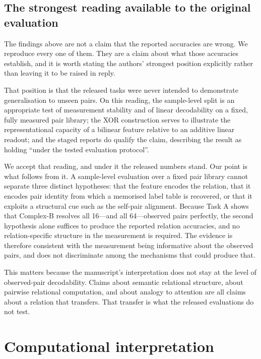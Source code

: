 \documentclass[11pt,a4paper]{article}
\begin{document}
\subsection{The strongest reading available to the original evaluation}
\label{sec:defence}

The findings above are not a claim that the reported accuracies are wrong. We
reproduce every one of them. They are a claim about what those accuracies
establish, and it is worth stating the authors' strongest position explicitly
rather than leaving it to be raised in reply.

That position is that the released tasks were never intended to demonstrate
generalisation to unseen pairs. On this reading, the sample-level split is an
appropriate test of measurement stability and of linear decodability on a
fixed, fully measured pair library; the XOR construction serves to illustrate
the representational capacity of a bilinear feature relative to an additive
linear readout; and the staged reports do qualify the claim, describing the
result as holding ``under the tested evaluation protocol''.

We accept that reading, and under it the released numbers stand. Our point is
what follows from it. A sample-level evaluation over a fixed pair library
cannot separate three distinct hypotheses: that the feature encodes the
relation, that it encodes pair identity from which a memorised label table is
recovered, or that it exploits a structural cue such as the self-pair
alignment. Because Task A shows that Complex-B resolves all 16---and all
64---observed pairs perfectly, the second hypothesis alone suffices to produce
the reported relation accuracies, and no relation-specific structure in the
measurement is required. The evidence is therefore consistent with the
measurement being informative about the observed pairs, and does not
discriminate among the mechanisms that could produce that.

This matters because the manuscript's interpretation does not stay at the
level of observed-pair decodability. Claims about semantic relational
structure, about pairwise relational computation, and about analogy to
attention are all claims about a relation that transfers. That transfer is
what the released evaluations do not test.

\section{Computational interpretation}
\label{sec:operator}
\end{document}
